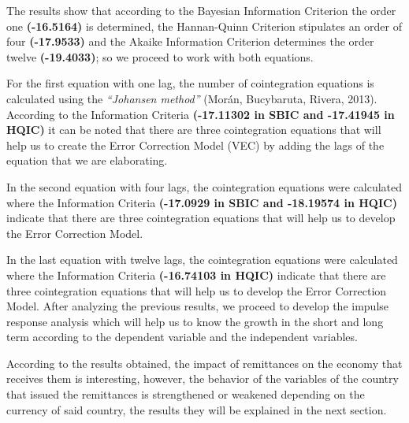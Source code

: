 \documentclass[12pt,english, spanish]{smfart}
\begin{document}
The results show that according to the Bayesian Information Criterion the order one \textbf{(-16.5164)} is determined, the Hannan-Quinn Criterion stipulates an order of four \textbf{(-17.9533)} and the Akaike Information Criterion determines the order twelve \textbf{(-19.4033)}; so we proceed to work with both equations.\par
For the first equation with one lag, the number of cointegration equations is calculated using the \textit{“Johansen method”} (Morán, Bucybaruta, Rivera, 2013). According to the Information Criteria \textbf{(-17.11302 in SBIC and -17.41945 in HQIC)} it can be noted that there are three cointegration equations that will help us to create the Error Correction Model (VEC) by adding the lags of the equation that we are elaborating.\par
In the second equation with four lags, the cointegration equations were calculated where the Information Criteria \textbf{(-17.0929 in SBIC and -18.19574 in HQIC)} indicate that there are three cointegration equations that will help us to develop the Error Correction Model.\par
In the last equation with twelve lags, the cointegration equations were calculated where the Information Criteria \textbf{(-16.74103 in HQIC)} indicate that there are three cointegration equations that will help us to develop the Error Correction Model.
After analyzing the previous results, we proceed to develop the impulse response analysis which will help us to know the growth in the short and long term according to the dependent variable and the independent variables. \par
According to the results obtained, the impact of remittances on the economy that receives them is interesting, however, the behavior of the variables of the country that issued the remittances is strengthened or weakened depending on the currency of said country, the results they will be explained in the next section.\par
\end{document}
